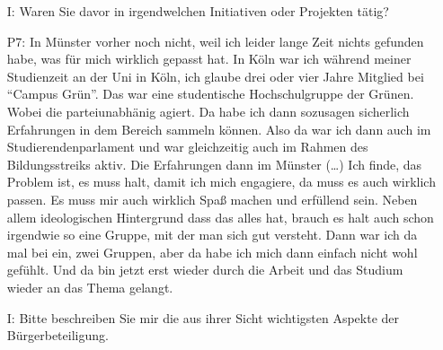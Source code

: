 \begin{itemize}
informiert wie es weiter ging, weil wir halt auch die Dokumentation des Prozesses gr{\"o}{\ss}tenteils gemacht haben. Das hei{\ss}, wir haben dann auch immer die Protokolle der einzelnen Treffen verschriftlicht und hochgeladen, und so was. Auf unsere Internetseite. Wir haben da eine Internetplattform, schon ein Jahr vorher, gegr{\"u}ndet auf Initiative von [Grundmann]. Bei dieser geht es darum, dass eine st{\"a}rkere Vernetzung zwischen Zivilgesellschaft und Wissenschaftlichkeit geschaffen werden soll. Wo wir halt schon einige Grundlagen dann auch gelegt haben. Da gibt es dann zum Beispiel Informationsmaterial, da gibt es das Transition Wiki in dem regionale Akteure schon aufgez{\"a}hlt sind, die durchaus eine Rolle spielen k{\"o}nnen. Also einzelne Gruppen, die kurz beschrieben. Aber auch Konzepte einf{\"u}hrend erl{\"a}utert. Wie "`Postwachstum"' oder "`Nachhaltigkeit - Was hei{\ss}t das eigentlich?"'.
    \item[I:] Waren Sie davor in irgendwelchen Initiativen oder Projekten t{\"a}tig?
    \item[P7:] In M{\"u}nster vorher noch nicht, weil ich leider lange Zeit nichts gefunden habe, was f{\"u}r mich wirklich gepasst hat. In K{\"o}ln war ich w{\"a}hrend meiner Studienzeit an der Uni in K{\"o}ln, ich glaube drei oder vier Jahre Mitglied bei "`Campus Gr{\"u}n"'. Das war eine studentische Hochschulgruppe der Gr{\"u}nen. Wobei die parteiunabh{\"a}nig agiert. Da habe ich dann sozusagen sicherlich Erfahrungen in dem Bereich sammeln k{\"o}nnen. Also da war ich dann auch im Studierendenparlament und war gleichzeitig auch im Rahmen des Bildungsstreiks aktiv. Die Erfahrungen dann im M{\"u}nster (\dots) Ich finde, das Problem ist, es muss halt, damit ich mich engagiere, da muss es auch wirklich passen. Es muss mir auch wirklich Spa{\ss} machen und erf{\"u}llend sein. Neben allem ideologischen Hintergrund dass das alles hat, brauch es halt auch schon irgendwie so eine Gruppe, mit der man sich gut versteht. Dann war ich da mal bei ein, zwei Gruppen, aber da habe ich mich dann einfach nicht wohl gef{\"u}hlt. Und da bin jetzt erst wieder durch die Arbeit und das Studium wieder an das Thema gelangt.
    \item[I:] Bitte beschreiben Sie mir die aus ihrer Sicht wichtigsten Aspekte der B{\"u}rgerbeteiligung.

\end{itemize}

